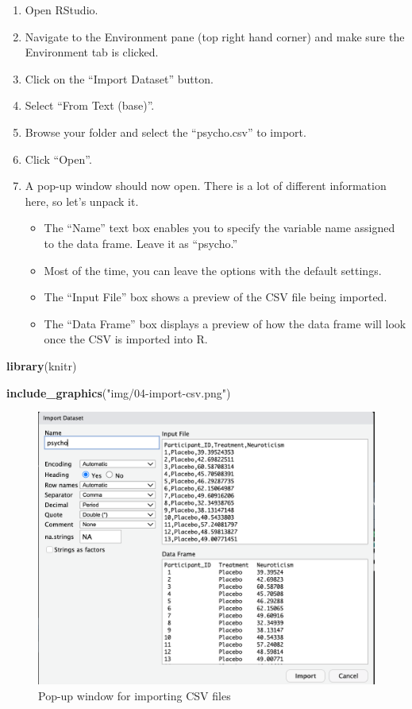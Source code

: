 \documentclass[
]{book}
\newenvironment{Shaded}{\begin{snugshade}}{\end{snugshade}}
\newcommand{\FunctionTok}[1]{\textcolor[rgb]{0.13,0.29,0.53}{\textbf{#1}}}
\newcommand{\NormalTok}[1]{#1}
\newcommand{\StringTok}[1]{\textcolor[rgb]{0.31,0.60,0.02}{#1}}
\begin{document}
\begin{enumerate}
\def\labelenumi{\arabic{enumi}.}
\item
  Open RStudio.
\item
  Navigate to the Environment pane (top right hand corner) and make sure the Environment tab is clicked.
\item
  Click on the ``Import Dataset'' button.
\item
  Select ``From Text (base)''.
\item
  Browse your folder and select the ``psycho.csv'' to import.
\item
  Click ``Open''.
\item
  A pop-up window should now open. There is a lot of different information here, so let's unpack it.

  \begin{itemize}
  \item
    The ``Name'' text box enables you to specify the variable name assigned to the data frame. Leave it as ``psycho.''
  \item
    Most of the time, you can leave the options with the default settings.
  \item
    The ``Input File'' box shows a preview of the CSV file being imported.
  \item
    The ``Data Frame'' box displays a preview of how the data frame will look once the CSV is imported into R.
  \end{itemize}
\end{enumerate}

\begin{Shaded}
\begin{Highlighting}[]
\FunctionTok{library}\NormalTok{(knitr)}

\FunctionTok{include\_graphics}\NormalTok{(}\StringTok{"img/04{-}import{-}csv.png"}\NormalTok{)}
\end{Highlighting}
\end{Shaded}

\begin{figure}
\centering
\includegraphics{img/04-import-csv.png}
\caption{\label{fig:unnamed-chunk-160}Pop-up window for importing CSV files}
\end{figure}
\end{document}
